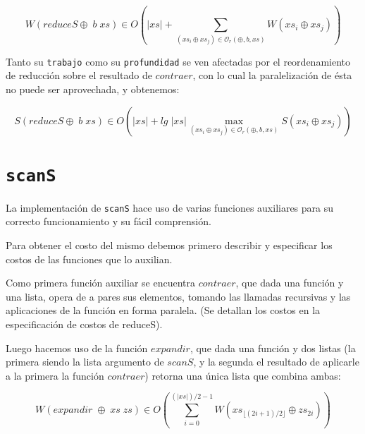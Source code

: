 \documentclass[a4paper,10pt]{article}
\begin{document}
\begin{equation*}
    W \left( reduceS \oplus \; b \; xs \right) \in
    O \left( \vert xs \vert + \sum_{(xs_i \oplus xs_j) \in \mathcal{O}_r(\oplus,b,xs)} W \left( xs_i \oplus xs_j \right) \right)
\end{equation*}

\bigskip

    Tanto su \texttt{trabajo} como su \texttt{profundidad} se ven afectadas por
el reordenamiento de reducción sobre el resultado de $contraer$, con lo cual la paralelización
de ésta no puede ser aprovechada, y obtenemos:

\begin{equation*}
    S \left( reduceS \oplus \; b \; xs \right) \in
    O \left( \vert xs \vert + lg \;\vert xs \vert \max_{(xs_i \oplus xs_j) \in \mathcal{O}_r(\oplus,b,xs)} S \left( xs_i \oplus xs_j \right) \right)
\end{equation*}


\bigskip


\section*{\texttt{scanS}}

    La implementación de \texttt{scanS} hace uso de varias funciones auxiliares
para su correcto funcionamiento y su fácil comprensión.



    Para obtener el costo del mismo debemos primero describir y especificar los 
costos de las funciones que lo auxilian.

    Como primera función auxiliar se encuentra $contraer$, que dada una función y
una lista, opera de a pares sus elementos, tomando las llamadas recursivas y las 
aplicaciones de la función en forma paralela. (Se detallan los costos en la
especificación de costos de reduceS).

\smallskip

    Luego hacemos uso de la función $expandir$, que dada una función y dos listas
(la primera siendo la lista argumento de $scanS$, y la segunda el resultado de aplicarle
a la primera la función $contraer$) retorna una única lista que combina ambas:


\begin{equation*}
    W \left( expandir \;\oplus \;xs \;zs \right) \in
    O \left( \sum_{i=0}^{(\vert xs \vert)/2 - 1} W \left( xs_{\lfloor (2i+1)/2 \rfloor} \oplus zs_{2i} \right) \right)
\end{equation*}
\end{document}
